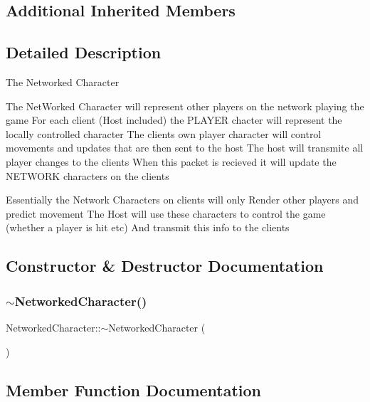 \subsection*{Additional Inherited Members}


\subsection{Detailed Description}
The Networked Character

The Net\+Worked Character will represent other players on the network playing the game For each client (Host included) the P\+L\+A\+Y\+ER chacter will represent the locally controlled character The clients own player character will control movements and updates that are then sent to the host The host will transmite all player changes to the clients When this packet is recieved it will update the N\+E\+T\+W\+O\+RK characters on the clients

Essentially the Network Characters on clients will only Render other players and predict movement The Host will use these characters to control the game (whether a player is hit etc) And transmit this info to the clients 

\subsection{Constructor \& Destructor Documentation}
\hypertarget{class_networked_character_ac09f304b62c04eaf431539e02b079954}{}\label{class_networked_character_ac09f304b62c04eaf431539e02b079954} 
\subsubsection{\texorpdfstring{$\sim$\+Networked\+Character()}{~NetworkedCharacter()}}
{\footnotesize\ttfamily Networked\+Character\+::$\sim$\+Networked\+Character (\begin{DoxyParamCaption}{ }\end{DoxyParamCaption})}



\subsection{Member Function Documentation}
\hypertarget{class_networked_character_a05c2f04191c8adc6dc733858403a39dd}{}\label{class_networked_character_a05c2f04191c8adc6dc733858403a39dd} 
